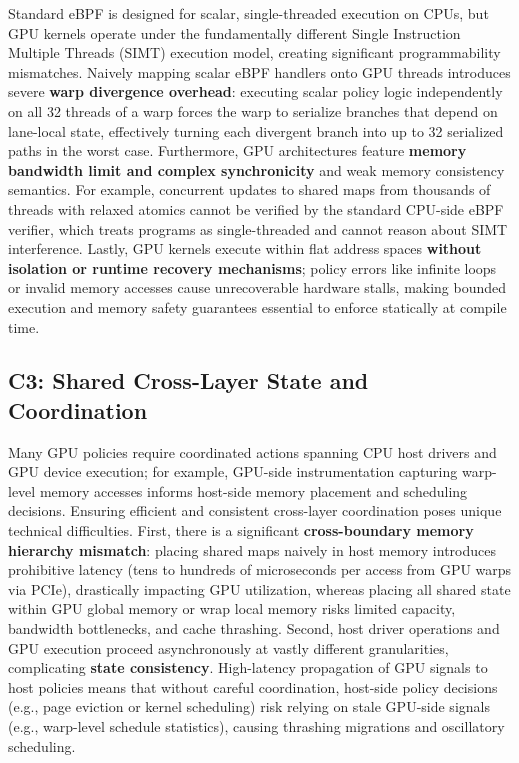 Standard eBPF is designed for scalar, single-threaded execution on CPUs, but GPU kernels operate under the fundamentally different Single Instruction Multiple Threads (SIMT) execution model, creating significant programmability mismatches. Naively mapping scalar eBPF handlers onto GPU threads introduces severe \textbf{warp divergence overhead}: executing scalar policy logic independently on all 32 threads of a warp forces the warp to serialize branches that depend on lane-local state, effectively turning each divergent branch into up to 32 serialized paths in the worst case. Furthermore, GPU architectures feature \textbf{memory bandwidth limit and complex synchronicity} and weak memory consistency semantics. For example, concurrent updates to shared maps from thousands of threads with relaxed atomics cannot be verified by the standard CPU-side eBPF verifier, which treats programs as single-threaded and cannot reason about SIMT interference. Lastly, GPU kernels execute within flat address spaces \textbf{without isolation or runtime recovery mechanisms}; policy errors like infinite loops or invalid memory accesses cause unrecoverable hardware stalls, making bounded execution and memory safety guarantees essential to enforce statically at compile time.

\subsection{C3: Shared Cross-Layer State and Coordination}

Many GPU policies require coordinated actions spanning CPU host drivers and GPU device execution; for example, GPU-side instrumentation capturing warp-level memory accesses informs host-side memory placement and scheduling decisions. Ensuring efficient and consistent cross-layer coordination poses unique technical difficulties. First, there is a significant \textbf{cross-boundary memory hierarchy mismatch}: placing shared maps naively in host memory introduces prohibitive latency (tens to hundreds of microseconds per access from GPU warps via PCIe), drastically impacting GPU utilization, whereas placing all shared state within GPU global memory or wrap local memory risks limited capacity, bandwidth bottlenecks, and cache thrashing. Second, host driver operations and GPU execution proceed asynchronously at vastly different granularities, complicating \textbf{state consistency}. High-latency propagation of GPU signals to host policies means that without careful coordination, host-side policy decisions (e.g., page eviction or kernel scheduling) risk relying on stale GPU-side signals (e.g., warp-level schedule statistics), causing thrashing migrations and oscillatory scheduling.

